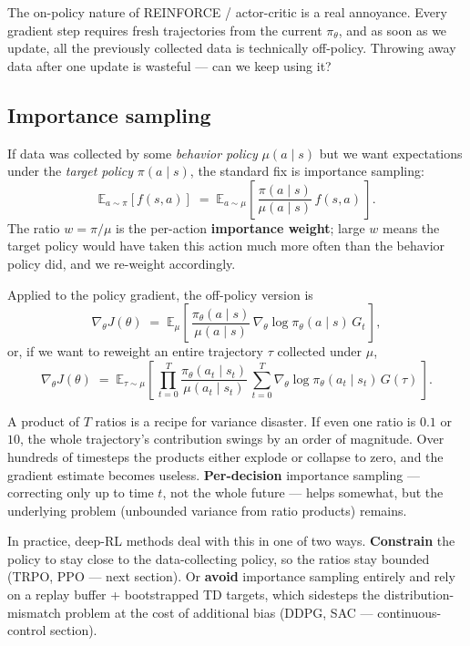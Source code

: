 \documentclass[11pt, oneside]{book}
\newcommand{\E}{\mathbb{E}}              %
\begin{document}
The on-policy nature of REINFORCE / actor-critic is a real annoyance.
Every gradient step requires fresh trajectories from the current $\pi_\theta$, and as
soon as we update, all the previously collected data is technically off-policy.
Throwing away data after one update is wasteful --- can we keep using it?

\subsection{Importance sampling}

If data was collected by some \emph{behavior policy} $\mu(a \mid s)$ but we want
expectations under the \emph{target policy} $\pi(a \mid s)$, the standard fix is
importance sampling:
\[
  \E_{a \sim \pi}[f(s,a)] \;=\; \E_{a \sim \mu}\!\left[\, \frac{\pi(a \mid s)}{\mu(a \mid s)}\, f(s,a)\, \right].
\]
The ratio $w = \pi/\mu$ is the per-action \textbf{importance weight}; large $w$ means
the target policy would have taken this action much more often than the behavior
policy did, and we re-weight accordingly.

Applied to the policy gradient, the off-policy version is
\[
  \nabla_\theta J(\theta) \;=\; \E_\mu\!\left[\, \frac{\pi_\theta(a \mid s)}{\mu(a \mid s)}\, \nabla_\theta \log \pi_\theta(a \mid s)\, G_t\, \right],
\]
or, if we want to reweight an entire trajectory $\tau$ collected under $\mu$,
\[
  \nabla_\theta J(\theta) \;=\; \E_{\tau \sim \mu}\!\left[\, \prod_{t=0}^T \frac{\pi_\theta(a_t \mid s_t)}{\mu(a_t \mid s_t)}\, \sum_{t=0}^T \nabla_\theta \log \pi_\theta(a_t \mid s_t)\, G(\tau)\, \right].
\]

\begin{intbox}[title={Why per-trajectory IS is doomed}]
A product of $T$ ratios is a recipe for variance disaster.
If even one ratio is $0.1$ or $10$, the whole trajectory's contribution swings by an
order of magnitude.
Over hundreds of timesteps the products either explode or collapse to zero, and the
gradient estimate becomes useless.
\textbf{Per-decision} importance sampling --- correcting only up to time $t$, not the
whole future --- helps somewhat, but the underlying problem (unbounded variance from
ratio products) remains.
\end{intbox}

In practice, deep-RL methods deal with this in one of two ways.
\textbf{Constrain} the policy to stay close to the data-collecting policy, so the
ratios stay bounded (TRPO, PPO --- next section).
Or \textbf{avoid} importance sampling entirely and rely on a replay buffer + bootstrapped
TD targets, which sidesteps the distribution-mismatch problem at the cost of additional
bias (DDPG, SAC --- continuous-control section).
\end{document}
